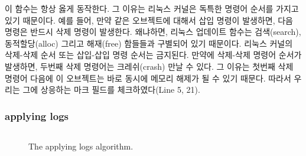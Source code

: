 이 함수는 항상 옳게 동작한다. 그 이유는 리눅스 커널은 독특한 명령어 순서를 가지고 있기 
때문이다.
예를 들어, 만약 같은 오브젝트에 대해서 삽입 명령이 발생하면, 다음 명령은 반드시 삭제 명령이 발생한다.
왜냐하면, 리눅스 업데이트 함수는 검색(search), 동적할당(alloc) 그리고 해재(free) 함들들과 
구별되어 있기 때문이다.
리눅스 커널의 삭제-삭제 순서 또는 삽입-삽입 명령 순서는 금지된다. 
만약에 삭제-삭제 명령어 순서가 발생하면, 두번째 삭제 명령어는 크레쉬(crash) 만날 수 있다.
그 이유는 첫번째 삭제 명령어 다음에 이 오브젝트는 바로 동시에 메모리 해제가 될 수 있기 때문다.
따라서 우리는 그에 상응하는 마크 필드를 체크하였다(Line 5, 21).


\subsubsection{applying logs}

\begin{figure}[h]
\begin{center}
\inputminted[linenos,fontsize=\footnotesize, tabsize=4]{c}{src/ldu_physical.c}
\end{center}
\caption{The \LDU applying logs algorithm.}
\label{fig:glduphysicalupdate}
\end{figure}




